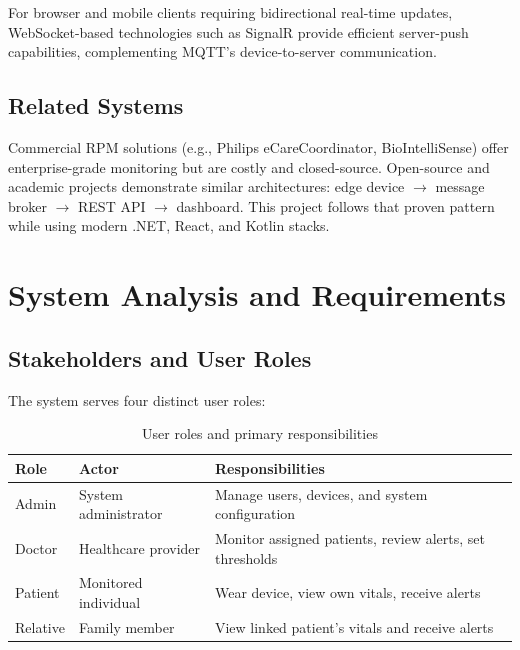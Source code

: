 \documentclass[12pt,a4paper]{report}
\begin{document}
For browser and mobile clients requiring bidirectional real-time updates, WebSocket-based technologies such as SignalR provide efficient server-push capabilities, complementing MQTT's device-to-server communication.

\section{Related Systems}

Commercial RPM solutions (e.g., Philips eCareCoordinator, BioIntelliSense) offer enterprise-grade monitoring but are costly and closed-source. Open-source and academic projects demonstrate similar architectures: edge device $\rightarrow$ message broker $\rightarrow$ REST API $\rightarrow$ dashboard. This project follows that proven pattern while using modern .NET, React, and Kotlin stacks.

\chapter{System Analysis and Requirements}
\label{ch:requirements}

\section{Stakeholders and User Roles}

The system serves four distinct user roles:

\begin{table}[H]
  \centering
  \caption{User roles and primary responsibilities}
  \label{tab:roles}
  \begin{tabular}{@{}llp{7cm}@{}}
    \toprule
    \textbf{Role} & \textbf{Actor} & \textbf{Responsibilities} \\
    \midrule
    Admin       & System administrator & Manage users, devices, and system configuration \\
    Doctor      & Healthcare provider    & Monitor assigned patients, review alerts, set thresholds \\
    Patient     & Monitored individual   & Wear device, view own vitals, receive alerts \\
    Relative    & Family member          & View linked patient's vitals and receive alerts \\
    \bottomrule
  \end{tabular}
\end{table}
\end{document}
